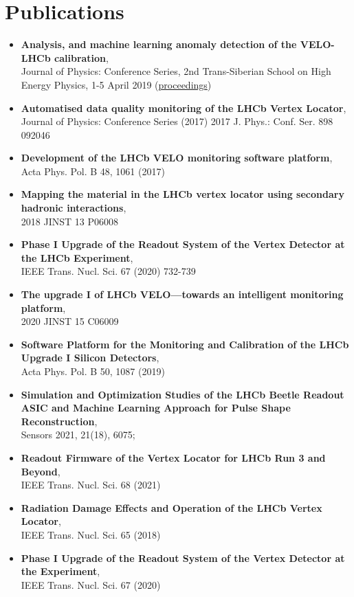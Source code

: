 \section*{Publications}
\begin{itemize}

  \item \textbf{Analysis, and machine learning anomaly detection of the VELO-LHCb calibration},
        \\ Journal of Physics: Conference Series, 2nd Trans-Siberian School on High Energy Physics, 1-5 April 2019 (\href{https://doi.org/10.1088/1742-6596/1337/1/012006}{proceedings})

  \item \textbf{Automatised data quality monitoring of the LHCb Vertex Locator},
        \\ Journal of Physics: Conference Series (2017) 2017 J. Phys.: Conf. Ser. 898 092046

  \item \textbf{Development of the LHCb VELO monitoring software platform},
        \\ Acta Phys. Pol. B 48, 1061 (2017)

  \item \textbf{Mapping the material in the LHCb vertex locator using secondary hadronic interactions},
        \\ 2018 JINST 13 P06008

  \item \textbf{Phase I Upgrade of the Readout System of the Vertex Detector at the LHCb Experiment},
        \\ IEEE Trans. Nucl. Sci. 67 (2020) 732-739

  \item \textbf{The upgrade I of LHCb VELO—towards an intelligent monitoring platform},
        \\ 2020 JINST 15 C06009

  \item \textbf{Software Platform for the Monitoring and Calibration of the LHCb Upgrade I Silicon Detectors},
        \\ Acta Phys. Pol. B 50, 1087 (2019)

  \item \textbf{Simulation and Optimization Studies of the LHCb Beetle Readout ASIC and Machine Learning Approach for Pulse Shape Reconstruction},
        \\ Sensors 2021, 21(18), 6075;
  \item \textbf{Readout Firmware of the Vertex Locator for LHCb Run 3 and Beyond},
        \\ IEEE Trans. Nucl. Sci. 68 (2021)
  \item \textbf{Radiation Damage Effects and Operation of the LHCb Vertex Locator},
        \\ IEEE Trans. Nucl. Sci. 65 (2018)
  \item \textbf{Phase I Upgrade of the Readout System of the Vertex Detector at the Experiment},
        \\ IEEE Trans. Nucl. Sci. 67 (2020)
\end{itemize}


